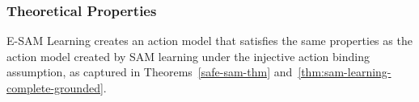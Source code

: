 \documentclass{article}
\newcommand{\tuple}[1]{\ensuremath{\left \langle #1 \right \rangle }}
\newcommand{\eff}{\textit{eff}}
\newcommand{\liftl}{L}
\newcommand{\lifta}{A}
\begin{document}




\subsubsection{Theoretical Properties}
E-SAM Learning creates an action model that satisfies the same properties as the action model created by SAM learning under the injective action binding assumption, as captured in Theorems~\ref{safe-sam-thm} and~\ref{thm:sam-learning-complete-grounded}. 
\end{document}
